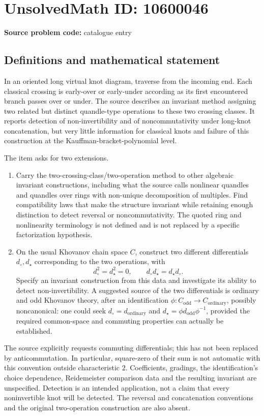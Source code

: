 \documentclass[11pt]{article}
\begin{document}
\section*{UnsolvedMath ID: 10600046}
\textbf{Source problem code:} catalogue entry
\subsection{Definitions and mathematical statement}
In an oriented long virtual knot diagram, traverse from the incoming end. Each classical crossing is early-over or early-under according as its first encountered branch passes over or under. The source describes an invariant method assigning two related but distinct quandle-type operations to these two crossing classes. It reports detection of non-invertibility and of noncommutativity under long-knot concatenation, but very little information for classical knots and failure of this construction at the Kauffman-bracket-polynomial level.

The item asks for two extensions.
\begin{enumerate}
\item Carry the two-crossing-class/two-operation method to other algebraic invariant constructions, including what the source calls nonlinear quandles and quandles over rings with non-unique decomposition of multiples. Find compatibility laws that make the structure invariant while retaining enough distinction to detect reversal or noncommutativity. The quoted ring and nonlinearity terminology is not defined and is not replaced by a specific factorization hypothesis.
\item On the usual Khovanov chain space \(C\), construct two different differentials \(d_\circ,d_\star\) corresponding to the two operations, with
\[
 d_\circ^2=d_\star^2=0,\qquad
 d_\circ d_\star=d_\star d_\circ.
\]
Specify an invariant construction from this data and investigate its ability to detect non-invertibility. A suggested source of the two differentials is ordinary and odd Khovanov theory, after an identification \(\phi:C_{\mathrm{odd}}\to C_{\mathrm{ordinary}}\), possibly noncanonical: one could seek \(d_\circ=d_{\mathrm{ordinary}}\) and \(d_\star=\phi d_{\mathrm{odd}}\phi^{-1}\), provided the required common-space and commuting properties can actually be established.
\end{enumerate}
The source explicitly requests commuting differentials; this has not been replaced by anticommutation. In particular, square-zero of their sum is not automatic with this convention outside characteristic \(2\). Coefficients, gradings, the identification's choice dependence, Reidemeister comparison data and the resulting invariant are unspecified. Detection is an intended application, not a claim that every noninvertible knot will be detected. The reversal and concatenation conventions and the original two-operation construction are also absent.
\end{document}
